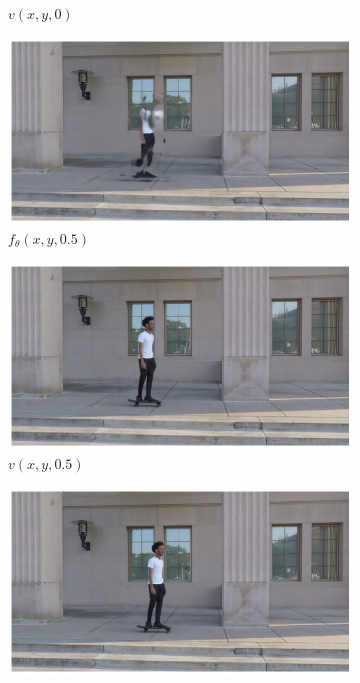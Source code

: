 \documentclass{article}
\begin{document}
\begin{figure}[h]
\begin{subfigure}{0.2\textwidth}
    \caption{$v(x,y,0)$}
\end{subfigure}%
\begin{subfigure}{0.2\textwidth}
	\centering
    \includegraphics[width=1\linewidth]{nd_scene/Skating_out.jpg}
    \caption{$f_{\theta}(x,y,0.5)$}
\end{subfigure}%
\begin{subfigure}{0.2\textwidth}
	\centering
    \includegraphics[width=1\linewidth]{nd_scene/Skating_GT.jpg}
    \caption{$v(x,y,0.5)$}
\end{subfigure}%
\begin{subfigure}{0.2\textwidth}
	\centering
    \includegraphics[width=1\linewidth]{nd_scene/Skating_I1.jpg}

\end{subfigure}
\end{figure}
\end{document}
